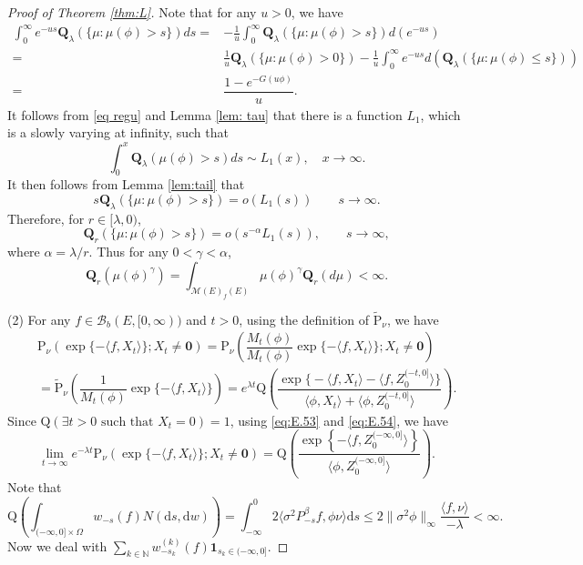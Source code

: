 \documentclass[12pt,a4paper]{amsart}
\numberwithin{equation}{section}
\theoremstyle{plain}
\theoremstyle{definition}
\theoremstyle{remark}
\begin{document}
\begin{proof}[Proof of Theorem \ref{thm:L}]
Note that for any $u>0$, we have
\begin{align}
\int_0^\infty e^{-us}{\mathbf Q}_\lambda(\{\mu: \mu(\phi)>s\})ds=&-\frac{1}{u}\int^\infty_0{\mathbf Q}_\lambda(\{\mu: \mu(\phi)>s\})d(e^{-us})\\
=&\frac{1}{u}{\mathbf Q}_\lambda(\{\mu: \mu(\phi)>0\})-\frac{1}{u}\int^\infty_0e^{-us}d({\mathbf Q}_\lambda(\{\mu: \mu(\phi)\le s\}))\\
=&\dfrac{1-e^{-G(u\phi)}}{u}.
\end{align}
It follows from  \eqref{eq regu} and Lemma \ref{lem: tau} that there is a function $L_1$, which is a slowly varying at infinity, such that
$$\int^x_0{\mathbf Q}_\lambda(\mu(\phi)>s)ds\sim L_1(x),\quad x\to\infty.$$
It then follows from Lemma \ref{lem:tail} that
$$s{\mathbf Q}_\lambda(\{\mu: \mu(\phi)>s\})=o(L_1(s))\qquad s\to\infty.$$
Therefore, for $r\in[\lambda, 0)$,
\begin{equation}
{\mathbf Q}_r(\{\mu: \mu(\phi)>s\})=o(s^{-\alpha}L_1(s)),\qquad s\to\infty,
\end{equation}
where $\alpha=\lambda/r.$
Thus for any $0<\gamma<\alpha$,
\[
{\mathbf Q}_r\left(\mu(\phi)^{\gamma}\right)=\int_{{\mathcal M(E)}_f(E)}\mu(\phi)^\gamma\mathbf Q_r(d\mu)<\infty.
\]

(2)
For any $f\in\mathcal B_b(E, [0, \infty))$ and $t>0$,  using the definition of $\widetilde{\mathrm P}_\nu$, we have
\begin{eqnarray*}
&&\mathrm P_\nu\left(\exp\{-\langle f, X_t\rangle \}; X_t\neq \mathbf 0\right)
=\mathrm P_\nu\left(\dfrac{M_t(\phi)}{M_t(\phi)}\exp\{-\langle f, X_t\rangle \};X_t\neq \mathbf 0\right)\\
&&=\widetilde{\mathrm P}_\nu\left(\dfrac{1}{M_t(\phi)}\exp\{-\langle f, X_t\rangle \}\right)
=e^{\lambda t}\mathrm Q\left(\dfrac{\exp\Big\{-\langle f, X_t\rangle -\langle f,  Z_0^{(-t, 0]}\rangle\Big \}}{\langle\phi, X_t\rangle +\langle\phi,  Z_0^{(-t, 0]}\rangle }\right).
\end{eqnarray*}
Since ${\mathrm Q}( \exists t>0 \mbox{ such that }X_t=0)=1$,
using  \eqref{eq:E.53} and  \eqref{eq:E.54}, we have
\begin{equation}\label{e:new}
\lim_{t\to\infty}e^{-\lambda t}\mathrm P_\nu\left(\exp\{-\langle f, X_t\rangle \};X_t\neq \mathbf 0\right)={\mathrm Q}\left(\dfrac{\exp\left\{-\langle f,Z_0^{(-\infty, 0]}\rangle \right\}}{\langle \phi, Z_0^{(-\infty, 0]}\rangle}\right).
\end{equation}
Note that
\[
\mathrm Q\left(\int_{(-\infty, 0]\times \Omega}w_{-s}(f)N(\mathrm ds, \mathrm dw)\right)=
\int^0_{-\infty}2\langle \sigma^2 P^{\beta}_{-s}f,\phi\nu\rangle \mathrm ds
\leq 2\|\sigma^2\phi\|_\infty\dfrac{\langle f,\nu\rangle }{-\lambda}<\infty.
\]
Now we deal with $\sum_{k\in\mathbb N}w^{(k)}_{-s_k}(f)\mathbf 1_{s_k\in (-\infty, 0]}$.


\end{proof}
\end{document}
